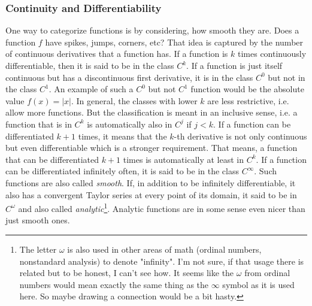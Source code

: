 \subsubsection{Continuity and Differentiability}
One way to categorize functions is by considering, how smooth they are. Does a function $f$ have spikes, jumps, corners, etc? That idea is captured by the number of continuous derivatives that a function has. If a function is $k$ times continuously differentiable, then it is said to be in the class $C^k$. If a function is just itself continuous but has a discontinuous first derivative, it is in the class $C^0$ but not in the class $C^1$. An example of such a $C^0$ but not $C^1$ function would be the absolute value $f(x) = |x|$. In general, the classes with lower $k$ are less restrictive, i.e. allow more functions. But the classification is meant in an inclusive sense, i.e. a function that is in $C^k$ is automatically also in $C^j$ if $j < k$. If a function can be differentiated $k+1$ times, it means that the $k$-th derivative is not only continuous but even differentiable which is a stronger requirement. That means, a function that can be differentiated $k+1$ times is automatically at least in $C^k$. If a function can be differentiated infinitely often, it is said to be in the class $C^\infty$. Such functions are also called \emph{smooth}. If, in addition to be infinitely differentiable, it also has a convergent Taylor series at every point of its domain, it said to be in $C^\omega$ and also called \emph{analytic}\footnote{The letter $\omega$ is also used in other areas of math (ordinal numbers, nonstandard analysis) to denote "infinity". I'm not sure, if that usage there is related but to be honest, I can't see how. It seems like the $\omega$ from ordinal numbers would mean exactly the same thing as the $\infty$ symbol as it is used here. So maybe drawing a connection would be a bit hasty.}. Analytic functions are in some sense even nicer than just smooth ones.




